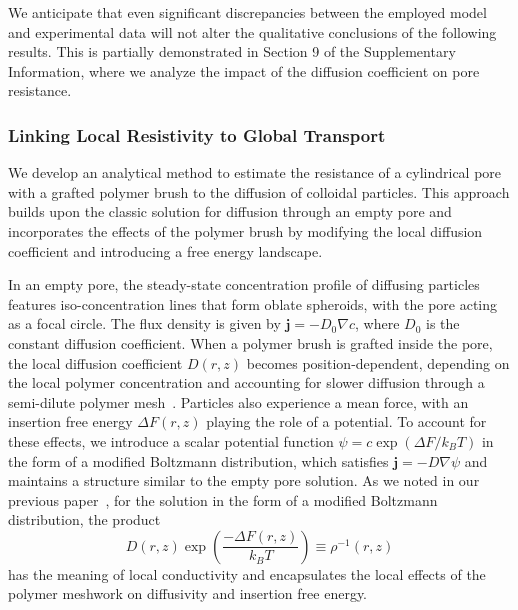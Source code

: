 \documentclass[12pt, a4paper]{article}
\begin{document}
We anticipate that even significant discrepancies between the employed model and experimental data will not alter the qualitative conclusions of the following results. 
This is partially demonstrated in Section 9 of the Supplementary Information, where we analyze the impact of the diffusion coefficient on pore resistance.



\subsubsection{Linking Local Resistivity to Global Transport}

We develop an analytical method to estimate the resistance of a cylindrical pore with a grafted polymer brush to the diffusion of colloidal particles. 
This approach builds upon the classic solution for diffusion through an empty pore and incorporates the effects of the polymer brush by modifying the local diffusion coefficient and introducing a free energy landscape.



In an empty pore, the steady-state concentration profile of diffusing particles features iso-concentration lines that form oblate spheroids, with the pore acting as a focal circle.
The flux density is given by $\mathbf{j} = -D_0 \nabla c$, where $D_0$ is the constant diffusion coefficient.
When a polymer brush is grafted inside the pore, the local diffusion coefficient $D(r,z)$ becomes position-dependent, depending on the local polymer concentration and accounting for slower diffusion through a semi-dilute polymer mesh~\cite{Cai2011}.
Particles also experience a mean force, with an insertion free energy $\Delta F(r,z)$ playing the role of a potential. To account for these effects, we introduce a scalar potential function $\psi = c\exp(\Delta F / k_B T)$ in the form of a modified Boltzmann distribution, which satisfies $\mathbf{j} = -D \nabla \psi$ and maintains a structure similar to the empty pore solution.
As we noted in our previous paper~\cite{Laktionov2023}, for the solution in the form of a modified Boltzmann distribution, the product
\begin{equation}
    D(r,z) \exp\left( \frac{-\Delta F(r,z)}{k_B T} \right) \equiv \rho^{-1}(r,z)
    \label{eq:local_conuctivity}
\end{equation}
has the meaning of local conductivity and encapsulates the local effects of the polymer meshwork on diffusivity and insertion free energy.
\end{document}
